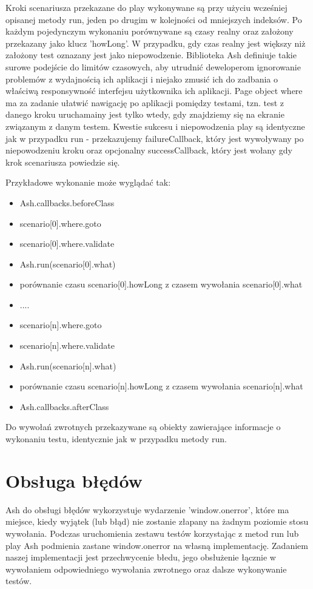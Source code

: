 \documentclass[brudnopis]{xmgr}
\begin{document}
Kroki scenariusza przekazane do play wykonywane są przy użyciu wcześniej opisanej metody run, jeden po drugim w kolejności od mniejszych indeksów. Po każdym pojedynczym wykonaniu porównywane są czasy realny oraz założony przekazany jako klucz 'howLong'. W przypadku, gdy czas realny jest większy niż założony test oznazany jest jako niepowodzenie. Biblioteka Ash definiuje takie surowe podejście do limitów czasowych, aby utrudnić deweloperom ignorowanie problemów z wydajnością ich aplikacji i niejako zmusić ich do zadbania o właściwą responsywność interfejsu użytkownika ich aplikacji. Page object where ma za zadanie ułatwić nawigację po aplikacji pomiędzy testami, tzn. test z danego kroku uruchamainy jest tylko wtedy, gdy znajdziemy się na ekranie związanym z danym testem. Kwestie sukcesu i niepowodzenia play są identyczne jak w przypadku run - przekazujemy failureCallback, który jest wywoływany po niepowodzeniu kroku oraz opcjonalny successCallback,  który jest wołany gdy krok scenariusza powiedzie się. 

Przykładowe wykonanie może wyglądać tak:

\begin{itemize}
  \item Ash.callbacks.beforeClass
  \item scenario[0].where.goto
  \item scenario[0].where.validate
  \item Ash.run(scenario[0].what)
  \item porównanie czasu scenario[0].howLong z czasem wywołania scenario[0].what
  \item ....
  \item scenario[n].where.goto
  \item scenario[n].where.validate
  \item Ash.run(scenario[n].what)
  \item porównanie czasu scenario[n].howLong z czasem wywołania scenario[n].what
  \item Ash.callbacks.afterClass
\end{itemize}

Do wywołań zwrotnych przekazywane są obiekty zawierające informacje o wykonaniu testu, identycznie jak w przypadku metody run.

\section{Obsługa błędów}

Ash do obsługi błędów wykorzystuje wydarzenie 'window.onerror', które ma miejsce, kiedy wyjątek (lub błąd) nie zostanie złapany na żadnym poziomie stosu wywołania. Podczas uruchomienia zestawu testów korzystając z metod run lub play Ash podmienia zastane window.onerror na własną implementację. Zadaniem naszej implementacji jest przechwycenie błedu, jego obsłużenie łącznie w wywołaniem odpowiedniego wywołania zwrotnego oraz dalsze wykonywanie testów.
\end{document}
